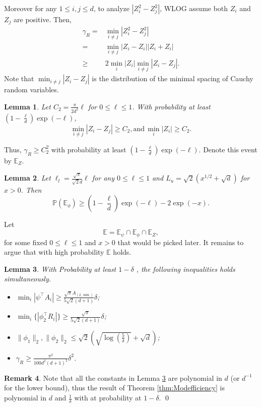 \documentclass[twoside]{article}
\newcommand{\Ephione}{\mathbb{E}_{\phi_1}}
\newcommand{\Epsi}{\mathbb{E}_{\psi}}
\newcommand{\Ephi}{\mathbb{E}_{\phi}}
\newcommand{\EZ}{\mathbb{E}_{Z}}
\newcommand{\E}{\mathbb{E}}
\newcommand{\Prob}[1]{\mathbb{P}\left(#1\right)}
\newtheorem{lemma}{Lemma}[section]
\theoremstyle{definition}
\newtheorem{remark}[lemma]{Remark}
\begin{document}
Moreover for any $1\le i, j \le d$, to analyze $\left\vert Z_i^2 - Z_j^2\right\vert
$, WLOG assume both $Z_i$ and $Z_j$ are positive. Then, 
\begin{align*}
\gamma_R =	& \min_{i\neq j} \left\vert Z_i^2 - Z_j^2 \right\vert \\
	=		& \min_{i\neq j}\left\vert Z_i - Z_i \right\vert	\left\vert Z_i + Z_i \right\vert \\
	\ge 	& 2\min_i\vert Z_i\vert\min_{i\neq j} \left\vert Z_i - Z_j \right\vert.
\end{align*}
Note that $\min_{i\neq j} \left\vert Z_i - Z_j \right\vert$ is the distribution of the minimal spacing of Cauchy random variables.

\begin{lemma}
\label{lem:CauchyGap}
Let $C_2 = \frac{\pi}{2d^2}\ell$ for $0\le \ell\le 1$. 
With probability at least $\left(1- \frac{\ell}{d}\right)\exp(-\ell)$,
\[
\min_{i\neq j} \left\vert Z_i - Z_j \right\vert \ge C_2, \text{and} \,  \min_i\vert Z_i\vert \ge C_2.
\]
\end{lemma}
Thus, $\gamma_R \ge C_2^2$ with probability at least $\left(1- \frac{\ell}{d}\right)\exp(-\ell)$.
Denote this event by $\EZ$.
\begin{lemma}
\label{lem:EventphiProb}
Let $\ell_l = \frac{\sqrt{\pi}}{\sqrt{2}d}\ell$ for any $0\le \ell\le 1$ and $ L_u = \sqrt{2}\left(x^{1/2}+\sqrt{d}\right)$ for $x>0$. Then
\[
\Prob{\Ephi} \ge \left(1- \frac{\ell}{d}\right)\exp(-\ell) - 2\exp(-x).
\]
\end{lemma}
Let  
\[
\E = \Epsi \cap\Ephi \cap \EZ,
\]
for some fixed $0\le \ell\le 1$ and $x>0$ that would be picked later.
It remains to argue that with high probability $\E$ holds.
\begin{lemma}
\label{lem:ConstantProb}
With Probability at least $1-\delta$ , the following inequalities holds simultaneously.
\begin{itemize}
\item $\min_i |\psi^{\top}A_i| \ge \frac{\sqrt{\pi}A_{(2,\min)}}{5\sqrt{2}(d+1)} \delta$;
\item $\min_i \{|\phi_2^{\top}R_i|\} \ge \frac{\sqrt{\pi}}{5\sqrt{2}(d+1)}\delta$;
\item $\|\phi_1\|_2, \|\phi_2\|_2 \le \sqrt{2}\left(\sqrt{\log(\frac{5}{\delta})}+\sqrt{d}\right)$;
\item $\gamma_R \ge\frac{\pi^2}{100d^2(d+1)^2}\delta^2$.
\end{itemize}
\end{lemma}
\begin{remark}
Note that all the constants in Lemma \ref{lem:ConstantProb} are polynomial in $d$ (or $d^{-1}$ for the lower bound), thus the result of Theorem \ref{thm:Modefficiency} is polynomial in $d$ and $\frac{1}{\delta}$ with at probability at $1-\delta$. \qed
\end{remark}
\end{document}
